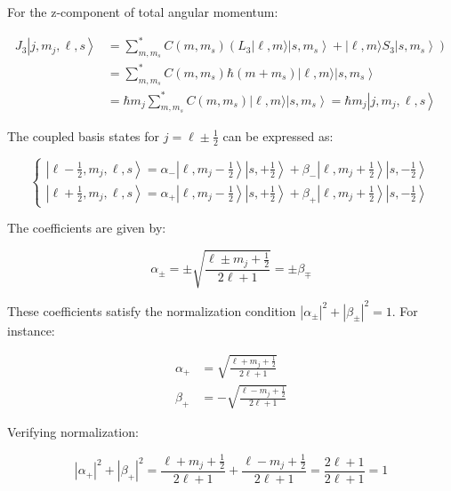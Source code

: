 For the z-component of total angular momentum:

\begin{align}
J_{3}\left|j, m_{j}, \ell, s\right\rangle &= \sum_{m, m_{s}}^{*} C\left(m, m_{s}\right)\left(L_{3}|\ell, m\rangle\left|s, m_{s}\right\rangle+|\ell, m\rangle S_{3}\left|s, m_{s}\right\rangle\right) \\
&= \sum_{m, m_{s}}^{*} C\left(m, m_{s}\right) \hbar\left(m+m_{s}\right)|\ell, m\rangle\left|s, m_{s}\right\rangle \\
&= \hbar m_{j} \sum_{m, m_{s}}^{*} C\left(m, m_{s}\right)|\ell, m\rangle\left|s, m_{s}\right\rangle=\hbar m_{j}\left|j, m_{j}, \ell, s\right\rangle
\end{align}

The coupled basis states for $j=\ell\pm\frac{1}{2}$ can be expressed as:

\[
\left\{\begin{array}{l}
\left|\ell-\frac{1}{2}, m_{j}, \ell, s\right\rangle=\alpha_{-}\left|\ell, m_{j}-\frac{1}{2}\right\rangle\left|s,+\frac{1}{2}\right\rangle+\beta_{-}\left|\ell, m_{j}+\frac{1}{2}\right\rangle\left|s,-\frac{1}{2}\right\rangle  \\
\left|\ell+\frac{1}{2}, m_{j}, \ell, s\right\rangle=\alpha_{+}\left|\ell, m_{j}-\frac{1}{2}\right\rangle\left|s,+\frac{1}{2}\right\rangle+\beta_{+}\left|\ell, m_{j}+\frac{1}{2}\right\rangle\left|s,-\frac{1}{2}\right\rangle
\end{array}\right.
\]

The coefficients are given by:

\begin{equation}
\alpha_{\pm}= \pm \sqrt{\frac{\ell \pm m_{j}+\frac{1}{2}}{2\ell+1}}= \pm \beta_{\mp}
\end{equation}

These coefficients satisfy the normalization condition $\left|\alpha_{\pm}\right|^{2}+\left|\beta_{\pm}\right|^{2}=1$. For instance:

\begin{align}
\alpha_{+} &= \sqrt{\frac{\ell+m_{j}+\frac{1}{2}}{2\ell+1}}  \\
\beta_{+} &= -\sqrt{\frac{\ell-m_{j}+\frac{1}{2}}{2\ell+1}}
\end{align}

Verifying normalization:

\begin{equation}
\left|\alpha_{+}\right|^{2}+\left|\beta_{+}\right|^{2}=\frac{\ell+m_{j}+\frac{1}{2}}{2\ell+1}+\frac{\ell-m_{j}+\frac{1}{2}}{2\ell+1}=\frac{2\ell+1}{2\ell+1}=1
\end{equation}


